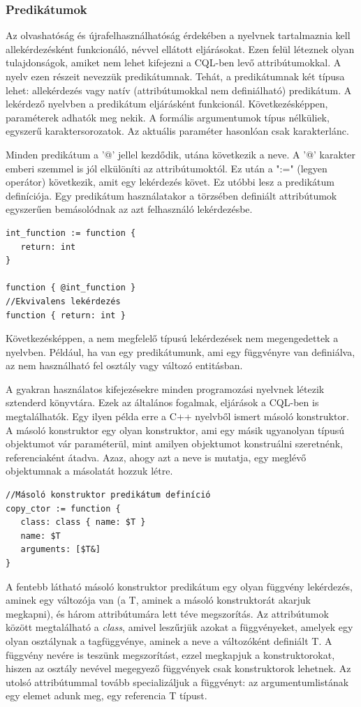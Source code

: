 \documentclass[a4paper,12pt]{report}
\begin{document}
\subsubsection{Predikátumok}
Az olvashatóság és újrafelhasználhatóság érdekében a nyelvnek tartalmaznia kell allekérdezésként funkcionáló, névvel ellátott eljárásokat. Ezen felül léteznek olyan tulajdonságok, amiket nem lehet kifejezni a CQL-ben levő attribútumokkal. A nyelv ezen részeit nevezzük predikátumnak. Tehát, a predikátumnak két típusa lehet: allekérdezés vagy natív (attribútumokkal nem definiálható) predikátum. A lekérdező nyelvben a predikátum eljárásként funkcionál. Következésképpen, paraméterek adhatók meg nekik. A formális argumentumok típus nélküliek, egyszerű karaktersorozatok. Az aktuális paraméter hasonlóan csak karakterlánc.
\par Minden predikátum a '@' jellel kezdődik, utána következik a neve. A '@' karakter emberi szemmel is jól elkülöníti az attribútumoktól. Ez után a ":=" (legyen operátor) következik, amit egy lekérdezés követ. Ez utóbbi lesz a predikátum definíciója. Egy predikátum használatakor a törzsében definiált attribútumok egyszerűen bemásolódnak az azt felhasználó lekérdezésbe.
\begin{verbatim}
int_function := function {
   return: int
}

function { @int_function }  
//Ekvivalens lekérdezés
function { return: int } 
\end{verbatim}
\par Következésképpen, a nem megfelelő típusú lekérdezések nem megengedettek a nyelvben. Például, ha van egy predikátumunk, ami egy függvényre van definiálva, az nem használható fel osztály vagy változó entitásban.
\par A gyakran használatos kifejezésekre minden programozási nyelvnek létezik sztenderd könyvtára. Ezek az általános fogalmak, eljárások a CQL-ben is megtalálhatók. Egy ilyen példa erre a C++ nyelvből ismert másoló konstruktor. A másoló konstruktor egy olyan konstruktor, ami egy másik ugyanolyan típusú objektumot vár paraméterül, mint amilyen objektumot konstruálni szeretnénk, referenciaként átadva. Azaz, ahogy azt a neve is mutatja, egy meglévő objektumnak a másolatát hozzuk létre.
\begin{verbatim}
//Másoló konstruktor predikátum definíció
copy_ctor := function {
   class: class { name: $T }
   name: $T
   arguments: [$T&]
}
\end{verbatim}
\par A fentebb látható másoló konstruktor predikátum egy olyan függvény lekérdezés, aminek egy változója van (a T, aminek a másoló konstruktorát akarjuk megkapni), és három attribútumára lett téve megszorítás. Az attribútumok között megtalálható a \textit{class}, amivel leszűrjük azokat a függvényeket, amelyek egy olyan osztálynak a tagfüggvénye, aminek a neve a változóként definiált T. A függvény nevére is teszünk megszorítást, ezzel megkapjuk a konstruktorokat, hiszen az osztály nevével megegyező függvények csak konstruktorok lehetnek. Az utolsó attribútummal tovább specializáljuk a függvényt: az argumentumlistának egy elemet adunk meg, egy referencia T típust.
\end{document}
